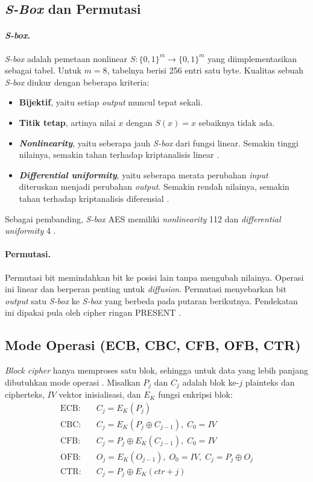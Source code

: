 \subsection{\textit{S-Box} dan Permutasi}
\paragraph{\textit{S-box}.} \textit{S-box} adalah pemetaan nonlinear $S : \{0,1\}^m \to \{0,1\}^m$
yang diimplementasikan sebagai tabel. Untuk $m = 8$, tabelnya berisi 256 entri satu byte. Kualitas
sebuah \textit{S-box} diukur dengan beberapa kriteria:
\begin{itemize}
  \item \textbf{Bijektif}, yaitu setiap \textit{output} muncul tepat sekali.
  \item \textbf{Titik tetap}, artinya nilai $x$ dengan $S(x) = x$ sebaiknya tidak ada.
  \item \textbf{\textit{Nonlinearity}}, yaitu seberapa jauh \textit{S-box} dari fungsi linear.
    Semakin tinggi nilainya, semakin tahan terhadap kriptanalisis linear \cite{matsui}.
  \item \textbf{\textit{Differential uniformity}}, yaitu seberapa merata perubahan \textit{input}
    diteruskan menjadi perubahan \textit{output}. Semakin rendah nilainya, semakin tahan terhadap
    kriptanalisis diferensial \cite{biham,nyberg}.
\end{itemize}
Sebagai pembanding, \textit{S-box} AES memiliki \textit{nonlinearity} 112 dan
\textit{differential uniformity} 4 \cite{aes}.

\paragraph{Permutasi.} Permutasi bit memindahkan bit ke posisi lain tanpa mengubah nilainya.
Operasi ini linear dan berperan penting untuk \textit{diffusion}. Permutasi menyebarkan bit \textit{output} satu
\textit{S-box} ke \textit{S-box} yang berbeda pada putaran berikutnya. Pendekatan ini dipakai
pula oleh cipher ringan PRESENT \cite{present}.

\subsection{Mode Operasi (ECB, CBC, CFB, OFB, CTR)}
\textit{Block cipher} hanya memproses satu blok, sehingga untuk data yang lebih panjang
dibutuhkan mode operasi \cite{nist80038a}. Misalkan $P_j$ dan $C_j$ adalah blok ke-$j$ plainteks
dan cipherteks, $IV$ vektor inisialisasi, dan $E_K$ fungsi enkripsi blok:
\begin{align*}
  \text{ECB:} \quad & C_j = E_K(P_j) \\
  \text{CBC:} \quad & C_j = E_K(P_j \oplus C_{j-1}), \; C_0 = IV \\
  \text{CFB:} \quad & C_j = P_j \oplus E_K(C_{j-1}), \; C_0 = IV \\
  \text{OFB:} \quad & O_j = E_K(O_{j-1}), \; O_0 = IV, \; C_j = P_j \oplus O_j \\
  \text{CTR:} \quad & C_j = P_j \oplus E_K(\mathit{ctr} + j)
\end{align*}

